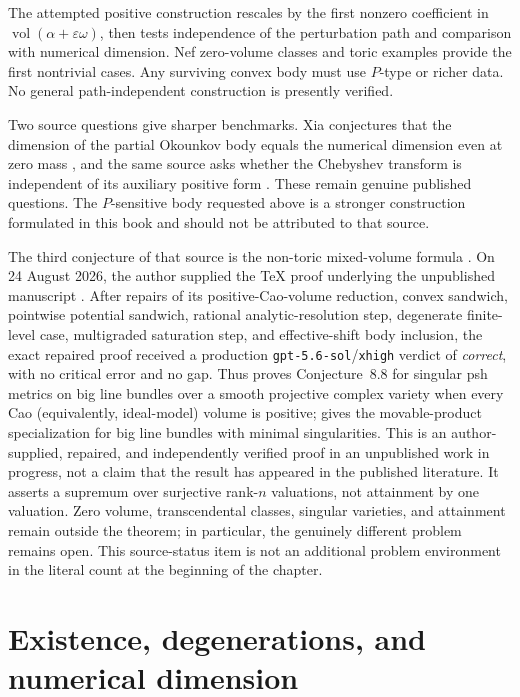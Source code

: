 The attempted positive construction rescales by the first nonzero coefficient
in \(\operatorname{vol}(\alpha+\varepsilon\omega)\), then tests independence
of the perturbation path and comparison with numerical dimension.  Nef
zero-volume classes and toric examples provide the first nontrivial cases.
Any surviving convex body must use \(P\)-type or richer data.  No general
path-independent construction is presently verified.

Two source questions give sharper benchmarks.  Xia conjectures that the
dimension of the partial Okounkov body equals the numerical dimension even
at zero mass \cite[Conjecture~5.29]{Xia21}, and the same source asks whether
the Chebyshev transform is independent of its auxiliary positive form
\cite[p.~34]{Xia21}.  These remain genuine published questions.  The
\(P\)-sensitive body requested above is a stronger construction formulated
in this book and should not be attributed to that source.

The third conjecture of that source is the non-toric mixed-volume formula
\cite[Conjecture~8.8]{Xia21}.  On 24 August 2026, the author supplied the TeX
proof underlying the unpublished manuscript \cite{XiaMVOB}.  After repairs
of its positive-Cao-volume reduction, convex sandwich, pointwise potential
sandwich, rational analytic-resolution step, degenerate finite-level case,
multigraded saturation step, and effective-shift body inclusion, the exact
repaired proof received a production \texttt{gpt-5.6-sol}/\texttt{xhigh}
verdict of \emph{correct}, with no critical error and no gap.  Thus
 proves Conjecture~8.8 for singular psh metrics on
big line bundles over a smooth projective complex variety when every Cao
(equivalently, ideal-model) volume is positive;
 gives the movable-product specialization for
big line bundles with minimal singularities.  This is an author-supplied,
repaired, and independently verified proof in an unpublished work in
progress, not a claim that the result has appeared in the published
literature.  It asserts a supremum over surjective rank-\(n\) valuations,
not attainment by one valuation.  Zero volume, transcendental classes,
singular varieties, and attainment remain outside the theorem; in
particular, the genuinely different problem
 remains open.
This source-status item is not an additional problem environment in the
literal count at the beginning of the chapter.

\section{Existence, degenerations, and numerical dimension}

